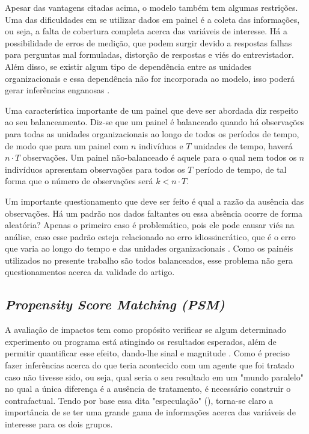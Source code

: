 Apesar das vantagens citadas acima, o modelo também tem algumas restrições. Uma das dificuldades em se utilizar dados em painel é a coleta das informações, ou seja, a falta de cobertura completa acerca das variáveis de interesse. Há a possibilidade de erros de medição, que podem surgir devido a respostas falhas para perguntas mal formuladas, distorção de respostas e viés do entrevistador. Além disso, se existir algum tipo de dependência entre as unidades organizacionais e essa dependência não for incorporada ao modelo, isso poderá gerar inferências enganosas \cite{Baltagi2005}.

Uma característica importante de um painel que deve ser abordada diz respeito ao seu balanceamento. Diz-se que um painel é balanceado quando há observações para todas as unidades organizacionais ao longo de todos os períodos de tempo, de modo que para um painel com $n$ indivíduos e $T$ unidades de tempo, haverá $n \cdot T$ observações. Um painel não-balanceado é aquele para o qual nem todos os $n$ indivíduos apresentam observações para todos os $T$ período de tempo, de tal forma que o número de observações será $k < n \cdot T$.
    
Um importante questionamento que deve ser feito é qual a razão da ausência das observações. Há um padrão nos dados faltantes ou essa absência ocorre de forma aleatória? Apenas o primeiro caso é problemático, pois ele pode causar viés na análise, caso esse padrão esteja relacionado ao erro idiossincrático, que é o erro que varia ao longo do tempo e das unidades organizacionais \cite{Hsiao2014}. Como os painéis utilizados no presente trabalho são todos balanceados, esse problema não gera questionamentos acerca da validade do artigo.

\subsection{\textit{Propensity Score Matching (PSM)}}

A avaliação de impactos tem como propósito verificar se algum determinado experimento ou programa está atingindo os resultados esperados, além de permitir quantificar esse efeito, dando-lhe sinal e magnitude \cite{CameronTrivedi2005}. Como é preciso fazer inferências acerca do que teria acontecido com um agente que foi tratado caso não tivesse sido, ou seja, qual seria o seu resultado em um "mundo paralelo" no qual a única diferença é a ausência de tratamento, é necessário construir o contrafactual. Tendo por base essa dita "especulação" (), torna-se claro a importância de se ter uma grande gama de informações acerca das variáveis de interesse para os dois grupos.

